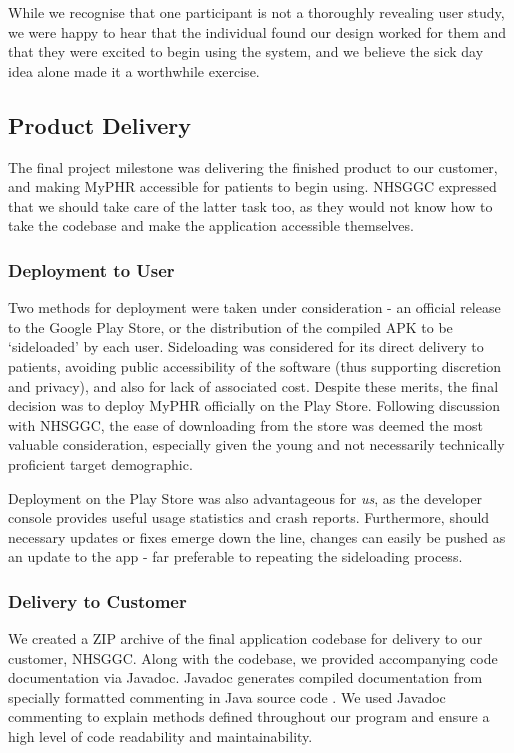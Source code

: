 \documentclass{l3proj}
\begin{document}
While we recognise that one participant is not a thoroughly revealing user study, we were happy to hear that the individual found our design worked for them and that they were excited to begin using the system, and we believe the sick day idea alone made it a worthwhile exercise.


\subsection{Product Delivery} \label{sec:3.6}
The final project milestone was delivering the finished product to our customer, and making MyPHR accessible for patients to begin using. NHSGGC expressed that we should take care of the latter task too, as they would not know how to take the codebase and make the application accessible themselves.


\subsubsection{Deployment to User} \label{sec:3.6.1}
Two methods for deployment were taken under consideration - an official release to the Google Play Store, or the distribution of the compiled APK to be `sideloaded' by each user. Sideloading was considered for its direct delivery to patients, avoiding public accessibility of the software (thus supporting discretion and privacy), and also for lack of associated cost. Despite these merits, the final decision was to deploy MyPHR officially on the Play Store. Following discussion with NHSGGC, the ease of downloading from the store was deemed the most valuable consideration, especially given the young and not necessarily technically proficient target demographic. 

Deployment on the Play Store was also advantageous for \textit{us}, as the developer console provides useful usage statistics and crash reports. Furthermore, should necessary updates or fixes emerge down the line, changes can easily be pushed as an update to the app - far preferable to repeating the sideloading process.


\subsubsection{Delivery to Customer} \label{sec:3.6.2}
We created a ZIP archive of the final application codebase for delivery to our customer, NHSGGC. Along with the codebase, we provided accompanying code documentation via Javadoc. Javadoc generates compiled documentation from specially formatted commenting in Java source code \cite{Javadoc}. We used Javadoc commenting to explain methods defined throughout our program and ensure a high level of code readability and maintainability.
\end{document}
